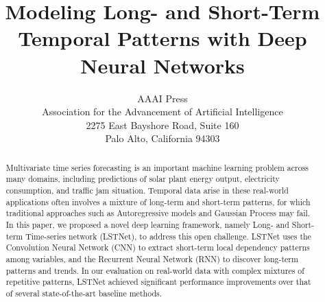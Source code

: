 \documentclass[letterpaper]{article} %
\begin{document}
%
\title{Modeling Long- and Short-Term Temporal Patterns with Deep Neural Networks}

\author{AAAI Press\\
Association for the Advancement of Artificial Intelligence\\
2275 East Bayshore Road, Suite 160\\
Palo Alto, California 94303\\
}

\iffalse
\author{Guokun Lai}
\affiliation{%
  \institution{Carnegie Mellon University}
}
\email{guokun@cs.cmu.edu}

\author{Wei-Cheng Chang}
\affiliation{%
  \institution{Carnegie Mellon University}
}
\email{wchang2@andrew.cmu.edu}

\author{Yiming Yang}
\affiliation{%
  \institution{Carnegie Mellon University}
}
\email{yiming@cs.cmu.edu}

\author{Hanxiao Liu}
\affiliation{%
  \institution{Carnegie Mellon University}
}
\email{hanxiaol@cs.cmu.edu}
\fi

\maketitle
\begin{abstract}
Multivariate time series forecasting is an important machine learning problem across many domains, including predictions of solar plant energy output, electricity consumption, and traffic jam situation. Temporal data arise in these real-world applications often involves a mixture of long-term and short-term patterns, for which traditional approaches such as Autoregressive models and Gaussian Process may fail. In this paper, we proposed a novel deep learning framework, namely Long- and Short-term Time-series network (LSTNet), to address this open challenge. LSTNet uses the Convolution Neural Network (CNN) to extract short-term local dependency patterns among variables, and the Recurrent Neural Network (RNN) to discover long-term patterns and trends. In our evaluation on real-world data with complex mixtures of repetitive patterns, LSTNet achieved significant performance improvements over that of several state-of-the-art baseline methods.

\end{abstract}


\maketitle









\end{document}
